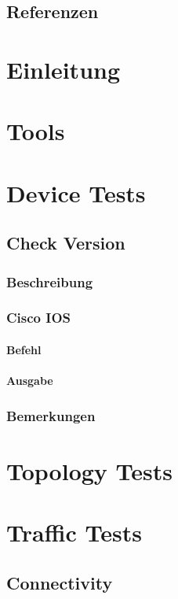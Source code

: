 \documentclass[a4,12pt]{scrartcl}
\begin{document}
\subsection{Referenzen}

\newpage
\section{Einleitung}

\newpage
\section{Tools}

\newpage
\section{Device Tests}
\subsection{Check Version}
\subsubsection{Beschreibung}
\subsubsection{Cisco IOS}
\paragraph{Befehl}
\paragraph{Ausgabe}
\subsubsection{Bemerkungen}

\newpage
\section{Topology Tests}

\newpage
\section{Traffic Tests}
\subsection{Connectivity}
\end{document}
